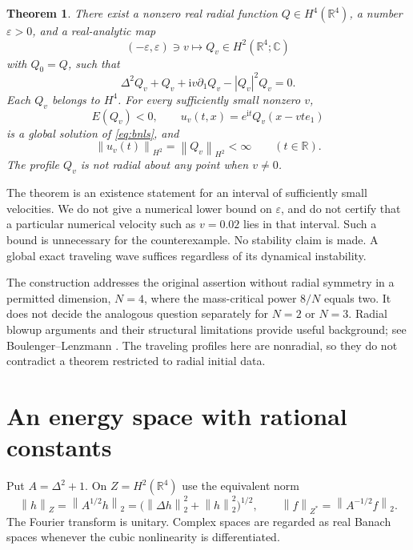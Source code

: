 \documentclass[11pt,a4paper]{article}
\newtheorem{theorem}{Theorem}[section]
\theoremstyle{definition}\newtheorem{definition}[theorem]{Definition}
\theoremstyle{remark}\newtheorem{remark}[theorem]{Remark}
\newcommand{\R}{\mathbb R}
\newcommand{\C}{\mathbb C}
\newcommand{\ii}{\mathrm i}
\newcommand{\norm}[1]{\left\|#1\right\|}
\begin{document}
\begin{theorem}\label{thm:main}
There exist a nonzero real radial function \(Q\in H^4(\R^4)\), a number \(\varepsilon>0\), and a real-analytic map
\[
 (-\varepsilon,\varepsilon)\ni v\longmapsto Q_v\in H^2(\R^4;\C)
\]
with \(Q_0=Q\), such that
\begin{equation}\label{eq:profile}
 \Delta^2Q_v+Q_v+\ii v\partial_1Q_v-|Q_v|^2Q_v=0.
\end{equation}
Each \(Q_v\) belongs to \(H^4\). For every sufficiently small nonzero \(v\),
\[
 E(Q_v)<0,\qquad
 u_v(t,x)=e^{\ii t}Q_v(x-vte_1)
\]
is a global solution of \eqref{eq:bnls}, and
\[
 \norm{u_v(t)}_{H^2}=\norm{Q_v}_{H^2}<\infty\qquad(t\in\R).
\]
The profile \(Q_v\) is not radial about any point when \(v\ne0\).
\end{theorem}

The theorem is an existence statement for an interval of sufficiently small velocities. We do not give a numerical lower bound on \(\varepsilon\), and do not certify that a particular numerical velocity such as \(v=0.02\) lies in that interval. Such a bound is unnecessary for the counterexample. No stability claim is made. A global exact traveling wave suffices regardless of its dynamical instability.

The construction addresses the original assertion without radial symmetry in a permitted dimension, \(N=4\), where the mass-critical power \(8/N\) equals two. It does not decide the analogous question separately for \(N=2\) or \(N=3\). Radial blowup arguments and their structural limitations provide useful background; see Boulenger--Lenzmann \cite{BL}. The traveling profiles here are nonradial, so they do not contradict a theorem restricted to radial initial data.

\section{An energy space with rational constants}

Put \(A=\Delta^2+1\). On \(Z=H^2(\R^4)\) use the equivalent norm
\begin{equation}\label{eq:znorm}
 \norm h_Z=\norm{A^{1/2}h}_2
 =\bigl(\norm{\Delta h}_2^2+\norm h_2^2\bigr)^{1/2},
 \qquad \norm f_{Z^*}=\norm{A^{-1/2}f}_2.
\end{equation}
The Fourier transform is unitary. Complex spaces are regarded as real Banach spaces whenever the cubic nonlinearity is differentiated.
\end{document}
